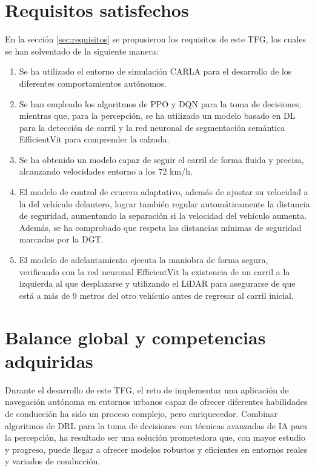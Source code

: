 \section{Requisitos satisfechos}

En la sección \ref{sec:requisitos} se propusieron los requisitos de este \ac{TFG}, los cuales se han solventado de la siguiente manera:

\begin{enumerate}
\item Se ha utilizado el entorno de simulación CARLA para el desarrollo de los diferentes comportamientos autónomos.
\item Se han empleado los algoritmos de \ac{PPO} y \ac{DQN} para la toma de decisiones, mientras que, para la percepción, se ha utilizado un modelo basado en \ac{DL} para la detección de carril y la red neuronal de segmentación semántica EfficientVit para comprender la calzada.
\item Se ha obtenido un modelo capaz de seguir el carril de forma fluida y precisa, alcanzando velocidades entorno a los 72 km/h.
\item El modelo de control de crucero adaptativo, además de ajustar su velocidad a la del vehículo delantero, lograr también regular automáticamente la distancia de seguridad, aumentando la separación si la velocidad del vehículo aumenta. Además, se ha comprobado que respeta las distancias mínimas de seguridad marcadas por la \ac{DGT}.
\item El modelo de adelantamiento ejecuta la maniobra de forma segura, verificando con la red neuronal EfficientVit la existencia de un carril a la izquierda al que desplazarse y utilizando el \ac{LiDAR} para asegurarse de que está a más de 9 metros del otro vehículo antes de regresar al carril inicial.
\end{enumerate}

\section{Balance global y competencias adquiridas}

Durante el desarrollo de este \ac{TFG}, el reto de implementar una aplicación de navegación autónoma en entornos urbanos capaz de ofrecer diferentes habilidades de conducción ha sido un proceso complejo, pero enriquecedor. Combinar algoritmos de \ac{DRL} para la toma de decisiones con técnicas avanzadas de \ac{IA} para la percepción, ha resultado ser una solución prometedora que, con mayor estudio y progreso, puede llegar a ofrecer modelos robustos y eficientes en entornos reales y variados de conducción.

